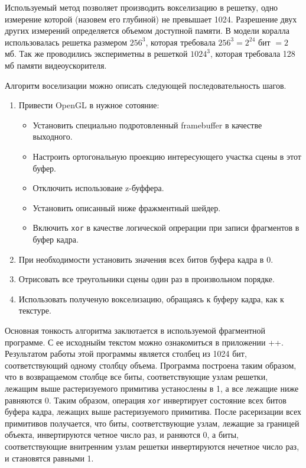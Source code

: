 Используемый метод позволяет производить вокселизацию в решетку, одно измерение которой (назовем его глубиной) не превышает 1024. Разрешение двух других измерений определяется объемом доступной памяти. В модели коралла использовалась решетка размером $256^3$, которая требовала $256^3 = 2^{24}$ бит $ = 2$ мб. Так же проводились экспериметны в решеткой $1024^3$, которая требовала 128 мб памяти видеоускорителя.

Алгоритм воселизации можно описать следующей последовательность шагов.

\begin{enumerate}
\item Привести OpenGL в нужное сотояние:
\begin{itemize}
\item Установить специально подротовленный framebuffer в качестве выходного.
\item Настроить ортогональную проекцию интересующего участка сцены в этот буфер.
\item Отключить использоваие z-буффера.
\item Установить описанный ниже фражментный шейдер.
\item Включить \texttt{xor} в качестве логической опрерации при записи фрагментов в буфер кадра.
\end{itemize}
\item При необходимости установить значения всех битов буфера кадра в 0.
\item Отрисовать все треугольники сцены один раз в произвольном порядке.
\item Использовать полученую вокселизацию, обращаясь к буферу кадра, как к текстуре.
\end{enumerate}

Основная тонкость алгоритма заклютается в используемой фрагментной программе. С ее исходныйм текстом можно ознакомиться в приложении ++. Результатом работы этой программы является столбец из 1024 бит, соответствующий одному столбцу объема. Программа построена таким образом, что в возвращаемом столбце все биты, соответствующие узлам решетки, лежащим выше растеризуемого примитива устанослены в 1, а все лежащие ниже равняются 0. Таким образом, операция \texttt{xor} инвертирует состояние всех битов буфера кадра, лежащих выше растеризуемого примитива. После расеризации всех примитивов получается, что биты, соответствующие узлам, лежащие за границей объекта, инвертируются четное число раз, и раняются 0, а биты, соответствующие внитренним узлам решетки инвертируются нечетное число раз, и становятся равными 1.

